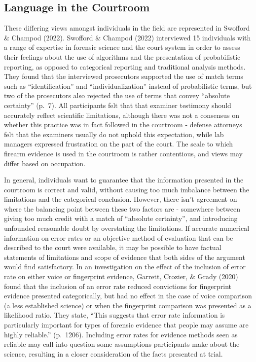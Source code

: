 \documentclass[print]{nuthesis}
\begin{document}
\hypertarget{language-in-the-courtroom}{%
\subsection{Language in the Courtroom}\label{language-in-the-courtroom}}

These differing views amongst individuals in the field are represented in Swofford \& Champod (2022).
Swofford \& Champod (2022) interviewed 15 individuals with a range of expertise in forensic science and the court system in order to assess their feelings about the use of algorithms and the presentation of probabilistic reporting, as opposed to categorical reporting and traditional analysis methods.
They found that the interviewed prosecutors supported the use of match terms such as ``identification'' and ``individualization'' instead of probabilistic terms, but two of the prosecutors also rejected the use of terms that convey ``absolute certainty'' (p.~7).
All participants felt that that examiner testimony should accurately reflect scientific limitations, although there was not a consensus on whether this practice was in fact followed in the courtroom - defense attorneys felt that the examiners usually do not uphold this expectation, while lab managers expressed frustration on the part of the court.
The scale to which firearm evidence is used in the courtroom is rather contentious, and views may differ based on occupation.

In general, individuals want to guarantee that the information presented in the courtroom is correct and valid, without causing too much imbalance between the limitations and the categorical conclusion.
However, there isn't agreement on where the balancing point between these two factors are - somewhere between giving too much credit with a match of ``absolute certainty'', and introducing unfounded reasonable doubt by overstating the limitations.
If accurate numerical information on error rates or an objective method of evaluation that can be described to the court were available, it may be possible to have factual statements of limitations and scope of evidence that both sides of the argument would find satisfactory.
In an investigation on the effect of the inclusion of error rate on either voice or fingerprint evidence, Garrett, Crozier, \& Grady (2020) found that the inclusion of an error rate reduced convictions for fingerprint evidence presented categorically, but had no effect in the case of voice comparison (a less established science) or when the fingerprint comparison was presented as a likelihood ratio.
They state, ``This suggests that error rate information is particularly important for types of forensic evidence that people may assume are highly reliable.'' (p.~1206).
Including error rates for evidence methods seen as reliable may call into question some assumptions participants make about the science, resulting in a closer consideration of the facts presented at trial.
\end{document}
